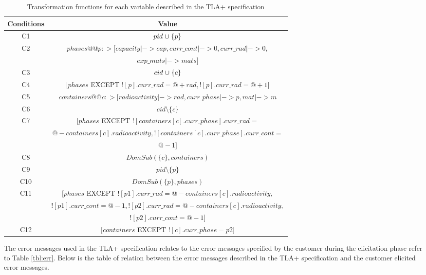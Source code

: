 \begin{table}[h]
\centering
\begin{tabular}{| c | c | }
	\cline{1-2}
	\textbf{Conditions} & \textbf{Value} \\ \hline
	C1 & $pid \mathbin{\mkern1mu\cup\mkern1mu} \{p\}$ \\ \hline
	C2 & $phases@@p:>[capacity |-> cap, curr\_cont |-> 0, curr\_rad |-> 0,$ 
	\\ & $exp\_mats |-> mats]$ \\ \hline
	C3 & $cid \mathbin{\mkern1mu\cup\mkern1mu} \{c\}$ \\ \hline
	C4 & $[phases$ EXCEPT $![p].curr\_rad = @ + rad, ![p].curr\_rad = @ + 1]$ \\ \hline
	C5 & $containers@@c:>[radioactivity |-> rad, curr\_phase |-> p, mat |-> m$ \\ \hline
    C6 & $cid \setminus \{c\}$ \\ \hline
    C7 & $[phases$ EXCEPT $![containers[c].curr\_phase].curr\_rad = $ 
    \\ & $@ - containers[c].radioactivity, ![containers[c].curr\_phase].curr\_cont = $ 
    \\ & $@ - 1]$ \\ \hline
    C8 & $DomSub(\{c\}, containers)$ \\ \hline
    C9 & $pid \setminus \{p\}$ \\ \hline
    C10 & $DomSub(\{p\}, phases)$ \\ \hline
    C11 & $[phases$ EXCEPT $![p1].curr\_rad = @ - containers[c].radioactivity, $ 
    \\ & $![p1].curr\_cont = @ - 1, ![p2].curr\_rad = @ - containers[c].radioactivity, $ 
    \\ & $![p2].curr\_cont = @ - 1]$ \\ \hline
    C12 & $[containers$ EXCEPT $![c].curr\_phase = p2]$ \\ \hline
\end{tabular}
\caption {Transformation functions for each variable described in the TLA+ specification}
\label{tbl:conds_spec}
\end{table}

The error messages used in the TLA+ specification relates to the error messages specified by the customer during the elicitation phase refer to Table \ref{tbl:err}. Below is the table of relation between the error messages described in the TLA+ specification and the customer elicited error messages.\\

